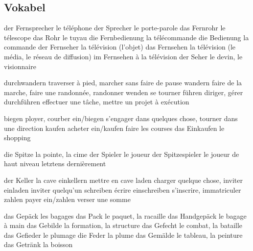 \subsection{Vokabel}
der Fernsprecher                 le téléphone
der Sprecher                     le porte-parole
das Fernrohr                     le télescope
das Rohr                         le tuyau
die Fernbedienung                la télécommande
die Bedienung                    la commande
der Fernseher                    la télévision (l'objet)
das Fernsehen                    la télévision (le média, le réseau de diffusion)
im Fernsehen                     à la télévision
der Seher                        le devin, le visionnaire

durchwandern                     traverser à pied, marcher sans faire de pause
wandern                          faire de la marche, faire une randonnée, randonner
wenden                           se tourner
führen                           diriger, gérer
durchführen                      effectuer une tâche, mettre un projet à exécution

biegen                           ployer, courber
ein/biegen                       s'engager dans quelques chose, tourner dans une direction
kaufen                           acheter
ein/kaufen                       faire les courses
das Einkaufen                    le shopping

die Spitze                       la pointe, la cime
der Spieler                      le joueur
der Spitzespieler                le joueur de haut niveau
letztens                         dernièrement

der Keller                       la cave
einkellern                       mettre en cave
laden                            charger quelque chose, inviter
einladen                         inviter quelqu'un
schreiben                        écrire
einschreiben                     s'inscrire, immatriculer
zahlen                           payer
ein/zahlen                       verser une somme

das Gepäck                       les bagages
das Pack                         le paquet, la racaille
das Handgepäck                   le bagage à main
das Gebilde                      la formation, la structure
das Gefecht                      le combat, la bataille
das Gefieder                     le plumage
die Feder                        la plume
das Gemälde                      le tableau, la peinture
das Getränk                      la boisson

